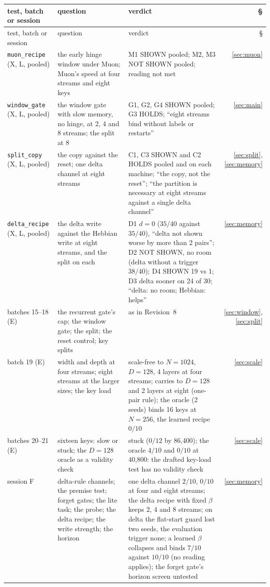 \documentclass[11pt]{article}
\begin{document}
{\scriptsize
\setlength{\tabcolsep}{4pt}
\begin{longtable}{@{}l>{\raggedright\arraybackslash}p{0.27\linewidth}>{\raggedright\arraybackslash}p{0.36\linewidth}r@{}}
\toprule
test, batch or session & question & verdict & \S\\
\midrule
\endfirsthead
\toprule
test, batch or session & question & verdict & \S\\
\midrule
\endhead
\texttt{muon\_recipe} (X, L, pooled) & the early hinge window under Muon; Muon's speed at four streams and eight keys & M1 SHOWN pooled; M2, M3 NOT SHOWN pooled; reading not met & \ref{sec:muon}\\
\texttt{window\_gate} (X, L, pooled) & the window gate with slow memory, no hinge, at 2, 4 and 8 streams; the split at 8 & G1, G2, G4 SHOWN pooled; G3 HOLDS; ``eight streams bind without labels or restarts'' & \ref{sec:main}\\
\texttt{split\_copy} (X, L, pooled) & the copy against the reset; one delta channel at eight streams & C1, C3 SHOWN and C2 HOLDS pooled and on each machine; ``the copy, not the reset''; ``the partition is necessary at eight streams against a single delta channel'' & \ref{sec:split}, \ref{sec:memory}\\
\texttt{delta\_recipe} (X, L, pooled) & the delta write against the Hebbian write at eight streams, and the split on each & D1 $d = 0$ ($35/40$ against $35/40$), ``delta not shown worse by more than 2 pairs''; D2 NOT SHOWN, no room (delta without a trigger $38/40$); D4 SHOWN 19 vs 1; D3 delta sooner on 24 of 30; ``delta: no room; Hebbian: helps'' & \ref{sec:memory}\\
\midrule
batches 15--18 (E) & the recurrent gate's cap; the window gate; the split; the reset control; key splits & as in Revision~8 & \ref{sec:window}, \ref{sec:split}\\
batch 19 (E) & width and depth at four streams; eight streams at the larger sizes; the key load & scale-free to $N = 1024$, $D = 128$, 4 layers at four streams; carries to $D = 128$ and 2 layers at eight (one-pair rule); the oracle (2 seeds) binds 16 keys at $N = 256$, the learned recipe $0/10$ & \ref{sec:scale}\\
batches 20--21 (E) & sixteen keys: slow or stuck; the $D = 128$ oracle as a validity check & stuck ($0/12$ by 86{,}400); the oracle $4/10$ and $0/10$ at 40{,}800: the drafted key-load test has no validity check & \ref{sec:scale}\\
session F & delta-rule channels; the premise test; forget gates; the lite task; the probe; the delta recipe; the write strength; the horizon & one delta channel $2/10$, $0/10$ at four and eight streams; the delta recipe with fixed $\beta$ keeps 2, 4 and 8 streams; on delta the flat-start guard lost two seeds, the evaluation trigger none; a learned $\beta$ collapses and binds $7/10$ against $10/10$ (no reading applies); the forget gate's horizon screen untested & \ref{sec:memory}\\

\end{longtable}}
\end{document}
